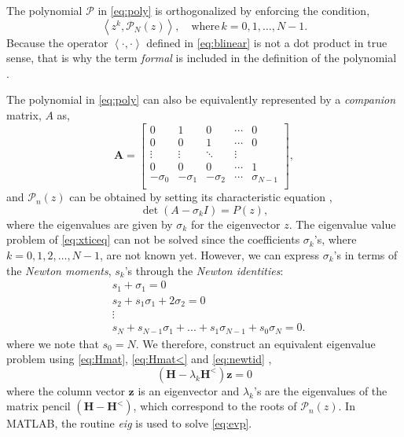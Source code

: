 The polynomial $\mathcal P$ in \eqref{eq:poly} is orthogonalized by enforcing the condition,
%
\begin{equation}
  \left \langle z^k, \mathcal {P}_N(z) \right \rangle, \quad \text{where} \, k = 0,1,\dots,N-1.
  \label{eq:orthogonalzie}
\end{equation}
%
Because the operator $\left \langle \cdot, \cdot \right \rangle$ defined in \eqref{eq:blinear} is not a dot product in true sense, that is why the term \emph{formal} is included in the definition of the polynomial \cite{Kravanja1999}.
%

The polynomial in \eqref{eq:poly} can also be equivalently represented by a \emph{companion} matrix, $A$ as,
%
\begin{equation}
  \mathbf A =
  \begin{bmatrix}
    0 & 1 & 0 & \cdots & 0 \\
    0 & 0 & 1 & \cdots & 0 \\
    \vdots & \vdots & \ddots & \vdots \\
    0 & 0 & 0 & \cdots & 1 \\
    -\sigma_0 & -\sigma_1 & -\sigma_2 & \cdots & \sigma_{N-1} \\
  \end{bmatrix},
  \label{eq:A}
\end{equation}
%
and $\mathcal P_n(z)$ can be obtained by setting its characteristic equation \cite{Gentle1998},
%
\begin{equation}
  \det( A - \sigma_k I) = P(z),
  \label{eq:xticeq}
\end{equation}
%
where the eigenvalues are given by $\sigma_k$ for the eigenvector $z$. The eigenvalue value problem of \eqref{eq:xticeq} can not be solved since the coefficients $\sigma_k$'s, where $k = 0, 1, 2, \dots, N-1 $, are not known yet. However, we can express $\sigma_k$'s in terms of the \emph{Newton moments}, $s_k$'s through the \emph{Newton identities}:
%
\begin{equation}
  \begin{aligned}
    & s_1 + \sigma_1 = 0 \\
    &  s_2 + s_1 \sigma_1 + 2 \sigma_2 = 0 \\
    &  {\vdots}\\
    &  s_N + s_{N-1} \sigma_{1} + ... + s_1 \sigma_{N-1} + s_0 \sigma_N = 0.
    \label{eq:newtid}
  \end{aligned}
\end{equation}
%
where we note that $s_0 = N$. We therefore, construct an equivalent eigenvalue problem using \eqref{eq:Hmat}, \eqref{eq:Hmat<} and \eqref{eq:newtid} \cite{Gillan2006c},
%
\begin{equation}
  \left( \mathbf H - \lambda_k \mathbf H^< \right) \mathbf z = 0
  \label{eq:evp}
\end{equation}
%
where the column vector $\mathbf{z}$ is an eigenvector and $\lambda_k$'s are the eigenvalues of the matrix pencil $(\mathbf H - \mathbf H^< )$, which correspond to the roots of $\mathcal P_n(z)$. In {MATLAB}, the routine \emph{eig} is used to solve \eqref{eq:evp}.
